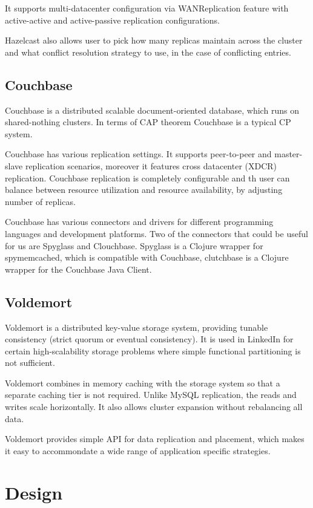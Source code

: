 \documentclass[a4paper]{article}
\begin{document}
It supports multi-datacenter configuration via WANReplication feature with active-active and active-passive replication configurations.

Hazelcast also allows user to pick how many replicas maintain across the cluster and what conflict resolution strategy to use, in the case of conflicting entries.  

\subsection*{Couchbase}

Couchbase is a distributed scalable document-oriented database, which runs on shared-nothing clusters.
In terms of CAP theorem Couchbase is a typical CP system.

Couchbase has various replication settings.
It supports peer-to-peer and master-slave replication scenarios, moreover it features cross datacenter (XDCR) replication.
Couchbase replication is completely configurable and th user can balance between resource utilization and resource availability, by adjusting number of replicas.

Couchbase has various connectors and drivers for different programming languages and development platforms. 
Two of the connectors that could be useful for us are Spyglass and Clouchbase. 
Spyglass is a Clojure wrapper for spymemcached, which is compatible with Couchbase, clutchbase is a Clojure wrapper for the Couchbase Java Client.

\subsection*{Voldemort}

Voldemort is a distributed key-value storage system, providing tunable consistency (strict quorum or eventual consistency). It is used in LinkedIn for certain 
high-scalability storage problems where simple functional partitioning is not sufficient. 

Voldemort combines in memory caching with the storage system so that a separate caching tier is not required. Unlike MySQL replication, the reads and writes scale horizontally. It also allows cluster expansion without rebalancing all data.

Voldemort provides simple API for data replication and placement, which makes it easy to accommondate a wide range of application specific strategies.

\section{Design}
\end{document}
